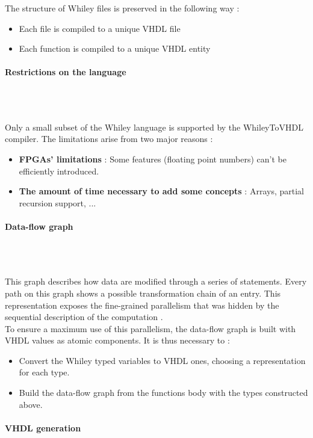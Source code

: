 \documentclass[10pt,a4paper]{article}
\renewcommand{\indent}{~\\\vspace{-.8cm}}
\newcommand{\pindent}{~\\\indent}
\begin{document}
The structure of Whiley files is preserved in the following way :
\begin{itemize}
	\item Each file is compiled to a unique VHDL file
	\item Each function is compiled to a unique VHDL entity
\end{itemize}

\paragraph{Restrictions on the language}\pindent

Only a small subset of the Whiley language is supported by the WhileyToVHDL compiler. The limitations arise from two major reasons :

\begin{itemize}
	\item \textbf{FPGAs' limitations} : Some features (floating point numbers) can't be efficiently introduced.
	\item \textbf{The amount of time necessary to add some concepts} : Arrays, partial recursion support, ...
\end{itemize}

\paragraph{Data-flow graph}\pindent

This graph describes how data are modified through a series of statements. Every path on this graph shows a possible transformation chain of an entry. This representation exposes the fine-grained parallelism that was hidden by the sequential description of the computation \cite{cardoso2003compilation, tripp2007trident, putnam2008chimps}. \\



To ensure a maximum use of this parallelism, the data-flow graph is built with VHDL values as atomic components. It is thus necessary to :

\begin{itemize}
	\item Convert the Whiley typed variables to VHDL ones, choosing a representation for each type.
	\item Build the data-flow graph from the functions body with the types constructed above.
\end{itemize}

\paragraph{VHDL generation}\pindent
\end{document}
